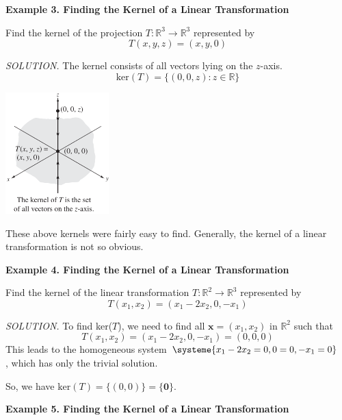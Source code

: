 \documentclass{article}
\newcommand\R{\mathbb{R}}
\begin{document}
    \textbf{Example 3. \textcolor{blue5}{Finding the Kernel of a Linear Transformation}}

    Find the kernel of the projection $T: \R^3  \to \R^3 $ represented by
    \[T(x,y,z) = (x,y,0)\]


    \begin{minipage}{0.5\linewidth}
    \textit{\textcolor{blue5}{SOLUTION.}} The kernel consists of all vectors lying on the $z$-axis.
    \[\text{ker}(T) = \{(0,0,z): z \in \R \} \]
    \end{minipage}    \hfill
    \begin{minipage}{0.3\linewidth}
        \includegraphics[width = 4cm]{images/zaxis.png}
    \end{minipage}

    These above kernels were fairly easy to find. Generally, the kernel of a linear transformation is not so obvious.

    \textbf{Example 4. \textcolor{blue5}{Finding the Kernel of a Linear Transformation}}

    Find the kernel of the linear transformation $T: \R^2  \to \R^3 $ represented by
    \[T(x_1, x_2) = (x_1 - 2x_2, 0, -x_1)\]

    \textit{\textcolor{blue5}{SOLUTION.}} To find ker($T$), we need to find all $ \textbf{x} = (x_1, x_2)$ in $ \R^2$ such that
    \[T(x_1, x_2) = (x_1 - 2x_2, 0, -x_1) = (0,0,0) \]
    This leads to the homogeneous system
    $\systeme {
        x_1 - 2x_2 = 0,
        0 = 0,
        -x_1 = 0
    }\quad $, which has only the trivial solution.

    So, we have $\text{ker}(T) = \{(0,0)\} = \{ \textbf{0} \}$.

    \textbf{Example 5. \textcolor{blue5}{Finding the Kernel of a Linear Transformation}}
\end{document}
